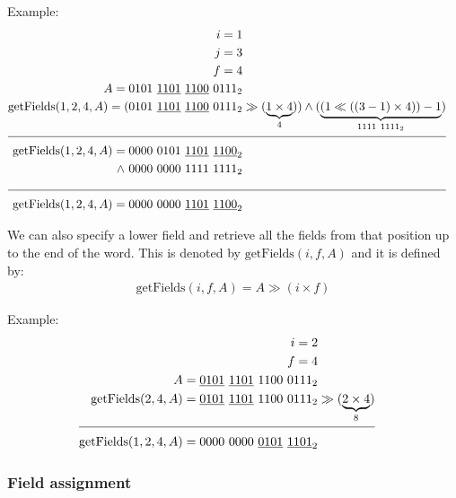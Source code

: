 Example:
\begin{align*}
    i = 1\\
    j = 3\\
    f = 4\\
    A = 0101\ \underline{1101}\ \underline{1100}\ 0111_2& \\
    \text{getFields}(1, 2, 4, A) = (0101\ \underline{1101}\ \underline{1100}\ 0111_2& \gg (\underbrace{1 \times 4}_{4})) \wedge (\underbrace{(1 \ll ((3 - 1) \times 4)) - 1}_{1111\ 1111_2})\\
    \cline{1-2}
    \text{getFields}(1, 2, 4, A) = 0000\ 0101\ \underline{1101}\ \underline{1100}_2&\\
    \wedge\ 0000\ 0000\ 1111\ 1111_2 \\
    \cline{1-2}
    \text{getFields}(1, 2, 4, A) = 0000\ 0000\ \underline{1101}\ \underline{1100}_2&
\end{align*}

We can also specify a lower field and retrieve all the fields from that position up to the end of the word. This is denoted by $\text{getFields}(i, f, A)$ and it is defined by:
\begin{align*}
    \text{getFields}(i, f, A) = A \gg (i \times f)
\end{align*}

Example:
\begin{align*}
    i = 2\\
    f = 4\\
    A = \underline{0101}\ \underline{1101}\ 1100\ 0111_2& \\
    \text{getFields}(2, 4, A) = \underline{0101}\ \underline{1101}\ 1100\ 0111_2& \gg (\underbrace{2 \times 4}_{8})\\
    \cline{1-2}
    \text{getFields}(1, 2, 4, A) = 0000\ 0000\ \underline{0101}\ \underline{1101}_2&
\end{align*}

\subsubsection{Field assignment}

